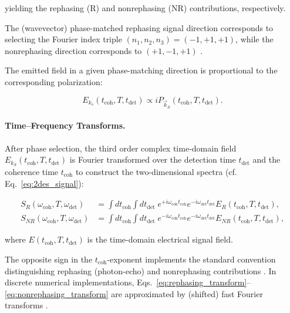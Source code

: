 \noindent 
yielding the rephasing (R) and nonrephasing (NR) contributions, respectively.

\noindent 
The (wavevector) phase-matched rephasing signal direction corresponds to selecting the Fourier index triple $(n_1,n_2,n_3)=(-1,+1,+1)$, while the nonrephasing direction corresponds to $(+1,-1,+1)$ \cite{mukamel1995principlesnonlinearoptical, cho2009twodimensionalopticalspectroscopy, greenetal2024vibrationalcoherenceshalfbroadband}.

\noindent 
The emitted field in a given phase-matching direction is proportional to the corresponding polarization:

\begin{equation}
	E_{k_s}(t_{\text{coh}},T,t_{\text{det}}) \propto i P_{\vec{k}_S}(t_{\text{coh}},T,t_{\text{det}}).
	\label{eq:field_polarization_relation}
\end{equation}


\paragraph{Time--Frequency Transforms.}

\noindent 
After phase selection, the third order complex time-domain field $E_{k_S}(t_{\text{coh}}, T, t_{\text{det}})$ is Fourier transformed over the detection time $t_{\text{det}}$ and the coherence time $t_{\text{coh}}$ to construct the two-dimensional spectra (cf. Eq.~\eqref{eq:2des_signal}):

\begin{align}
	S_{R}(\omega_{\text{coh}}, T, \omega_{\text{det}})
	 & =
	\int dt_{\text{coh}} \int dt_{\text{det}} \;
	e^{+ i \omega_{\text{coh}} t_{\text{coh}}} e^{- i \omega_{\text{det}} t_{\text{det}}}
	E_{R}(t_{\text{coh}}, T, t_{\text{det}}),
	\label{eq:rephasing_transform} \\
	S_{NR}(\omega_{\text{coh}}, T, \omega_{\text{det}})
	 & =
	\int dt_{\text{coh}} \int dt_{\text{det}} \;
	e^{- i \omega_{\text{coh}} t_{\text{coh}}} e^{- i \omega_{\text{det}} t_{\text{det}}}
	E_{NR}(t_{\text{coh}}, T, t_{\text{det}}),
	\label{eq:nonrephasing_transform}
\end{align}

\noindent 
where $E(t_{\text{coh}}, T, t_{\text{det}})$ is the time-domain electrical signal field.

\noindent 
The opposite sign in the $t_{\text{coh}}$-exponent implements the standard convention distinguishing rephasing (photon-echo) and nonrephasing contributions \cite{cho2009twodimensionalopticalspectroscopy, greenetal2024vibrationalcoherenceshalfbroadband}. In discrete numerical implementations, Eqs.~\eqref{eq:rephasing_transform}--\eqref{eq:nonrephasing_transform} are approximated by (shifted) fast Fourier transforms \cite{cho2009twodimensionalopticalspectroscopy, greenetal2024vibrationalcoherenceshalfbroadband}.


